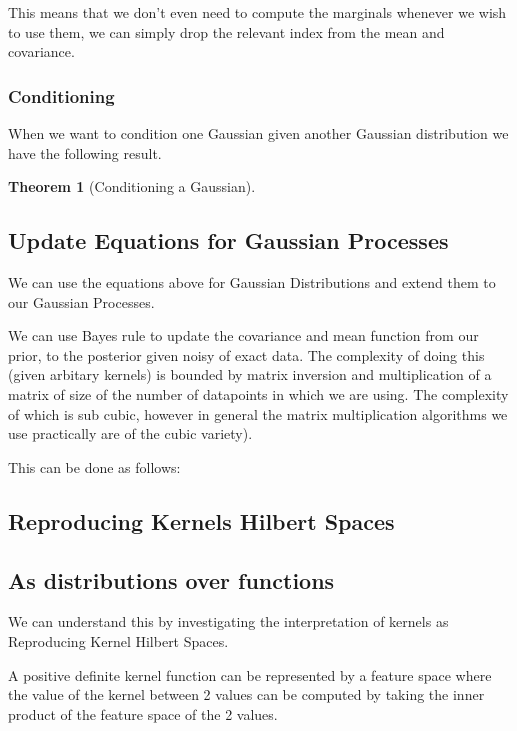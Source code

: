 \documentclass[12pt, a4paper]{report}
\theoremstyle{definition}
\newtheorem{theorem}{Theorem}[section]
\theoremstyle{definition}
\theoremstyle{definition}
\begin{document}
This means that we don't even need to compute the marginals whenever we wish to use them, we can simply drop the relevant index from the mean and covariance.
 

\subsubsection{Conditioning}

When we want to condition one Gaussian given another Gaussian distribution we have the following result.


\begin{theorem}[Conditioning a Gaussian]

\end{theorem}


\subsection{Update Equations for Gaussian Processes}

We can use the equations above for Gaussian Distributions and extend them to our Gaussian Processes.

We can use Bayes rule to update the covariance and mean function from our prior, to the posterior given noisy of exact data. The complexity of doing this (given arbitary kernels) is bounded by matrix inversion and  multiplication of a matrix of size of the number of datapoints in which we are using. The complexity of which is sub cubic, however in general the matrix multiplication algorithms we use practically are of the cubic variety).

This can be done as follows: 

\subsection{Reproducing Kernels Hilbert Spaces}



\subsection{As distributions over functions}


We can understand this by investigating the interpretation of kernels as Reproducing Kernel Hilbert Spaces.



A positive definite kernel function can be represented by a feature space where the value of the kernel between 2 values can be computed by taking the inner product of the feature space of the 2 values.
\end{document}
